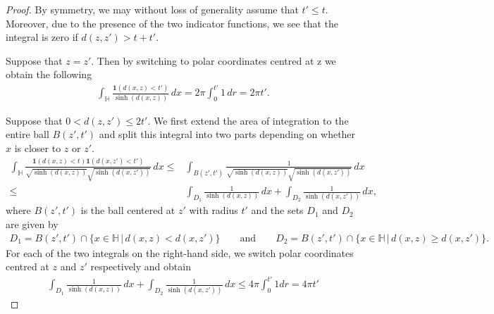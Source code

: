 \documentclass[11pt,twoside,reqno]{amsart}
\newcommand{\bH}{\mathbb{H}}
\newcommand{\1}{\mathrm{\mathbf{1}}}
\numberwithin{equation}{section}
\theoremstyle{plain}
\theoremstyle{definition}
\theoremstyle{remark}
\begin{document}
\begin{proof}
 By symmetry, we may without loss of generality assume that $t'\leq t$. Moreover, due to the presence of the two indicator functions, we see that the integral is zero if $d(z,z')>t+t'$.

Suppose that $z=z'$. Then by switching to polar coordinates centred at z we obtain the following 
\begin{equation}\label{EQ:Two_sqr_sinh_singu_1}
    \begin{aligned}
        \int_{\bH} \frac{\boldsymbol{1}(d(x,z)<t')}{\sinh(d(x,z)) } \, d x = 2\pi   \int_0^{t'} 1 \, d r = 2\pi t'. 
    \end{aligned}
\end{equation}

Suppose that $0<d(z,z') \leq 2t'$. We first extend the area of integration to the entire ball $B(z',t')$ and split this integral into two parts depending on whether $x$ is closer to $z$ or $z'$.
\begin{equation}\label{EQ:Two_sqr_sinh_singu_2}
    \begin{aligned}
        \int_{\bH} \frac{\boldsymbol{1}(d(x,z)<t)\boldsymbol{1}(d(x,z')<t')}{\sqrt{\sinh(d(x,z)) }\sqrt{\sinh(d(x,z')) }} \, d x  
        \leq{}& \int_{B(z',t')} \frac{1}{\sqrt{\sinh(d(x,z)) }\sqrt{\sinh(d(x,z')) }} \, d x  
        \\
        \leq{}&\int_{D_1} \frac{1}{\sinh(d(x,z))} \, d x + \int_{D_2} \frac{1}{\sinh(d(x,z')) } \, d x,
    \end{aligned}
\end{equation}
where $B(z',t')$ is the ball centered at $z'$ with radius $t'$ and the sets $D_1$ and $D_2$ are given by
\begin{equation*}
    \begin{aligned}
        D_1 = B(z',t')\cap \big\{ x \in \bH \,\big| \, d(x,z) < d(x,z')   \big\} \qquad\text{and}\qquad D_2 = B(z',t')\cap \big\{ x \in \bH \,\big|  \,d(x,z) \geq d(x,z')   \big\}.
    \end{aligned}
\end{equation*}
For each of the two integrals on the right-hand side, we switch polar coordinates centred at $z$ and $z'$ respectively and obtain
\begin{equation}\label{EQ:Two_sqr_sinh_singu_3}
    \begin{aligned}
          \int_{D_1} \frac{1}{\sinh(d(x,z))} \, d x + \int_{D_2} \frac{1}{\sinh(d(x,z')) } \, d x
          \leq 4\pi \int_0^{t'} 1 dr = 4\pi t'
    \end{aligned}
\end{equation}


\end{proof}
\end{document}
